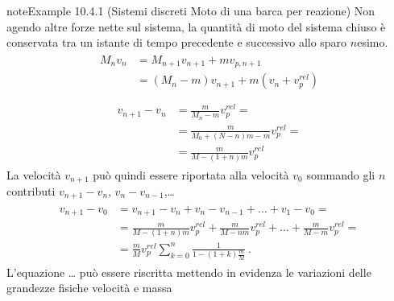 \documentclass[letterpaper,10pt,italian]{jupyterBook}
\begin{document}
\begin{sphinxadmonition}{note}{Example 10.4.1 (Sistemi discreti \sphinxhyphen{} Moto di una barca per reazione)}
\sphinxAtStartPar
Non agendo altre forze nette sul sistema, la quantità di moto del sistema chiuso è conservata tra un istante di tempo precedente e successivo allo sparo \(n\)\sphinxhyphen{}esimo.
\begin{equation*}
\begin{split}\begin{aligned}
  M_{n} v_{n} 
  & = M_{n+1} v_{n+1} + m v_{p,n+1} \\
  & = ( M_{n} - m ) v_{n+1} + m ( v_{n} + v_p^{rel} ) \\
\end{aligned}\end{split}
\end{equation*}\begin{equation*}
\begin{split}\begin{aligned}
  v_{n+1} - v_n & = \frac{m}{M_n - m} v_p^{rel} = \\
  & = \frac{m}{M_0 + (N-n)m - m} v_p^{rel} = \\
  & = \frac{m}{M - (1+n) m} v_p^{rel}
\end{aligned}\end{split}
\end{equation*}
\sphinxAtStartPar
La velocità \(v_{n+1}\) può quindi essere riportata alla velocità \(v_0\) sommando gli \(n\) contributi \(v_{n+1} - v_{n}\), \(v_{n} - v_{n-1}\),…
\begin{equation*}
\begin{split}\begin{aligned}
  v_{n+1} - v_0 & = v_{n+1} - v_n + v_n - v_{n-1} + \dots + v_1 - v_0 = \\
  & = \frac{m}{M - (1+n) m} v_p^{rel} +  \frac{m}{M - n m} v_p^{rel} + \dots + \frac{m}{M-m} v^{rel}_p = \\
  & = \frac{m}{M} v_p^{rel} \sum_{k = 0}^{n} \frac{1}{1 - (1+k) \frac{m}{M}} \ .
\end{aligned}\end{split}
\end{equation*}
\sphinxAtStartPar
{} L’equazione … può essere riscritta mettendo in evidenza le variazioni delle grandezze fisiche velocità e massa


\end{sphinxadmonition}
\end{document}
